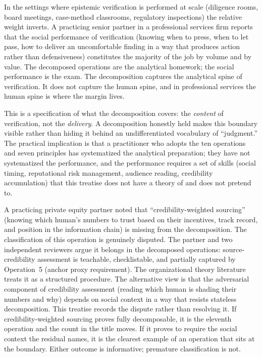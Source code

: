 \documentclass[11pt]{article}
\begin{document}
In the settings where epistemic verification is performed at scale (diligence rooms, board meetings, case-method classrooms, regulatory inspections) the relative weight inverts. A practicing senior partner in a professional services firm reports that the social performance of verification (knowing when to press, when to let pass, how to deliver an uncomfortable finding in a way that produces action rather than defensiveness) constitutes the majority of the job by volume and by value. The decomposed operations are the analytical homework; the social performance is the exam. The decomposition captures the analytical spine of verification. It does not capture the human spine, and in professional services the human spine is where the margin lives.

This is a specification of what the decomposition covers: the \emph{content} of verification, not the \emph{delivery}. A decomposition honestly held makes this boundary visible rather than hiding it behind an undifferentiated vocabulary of ``judgment.'' The practical implication is that a practitioner who adopts the ten operations and seven principles has systematized the analytical preparation; they have not systematized the performance, and the performance requires a set of skills (social timing, reputational risk management, audience reading, credibility accumulation) that this treatise does not have a theory of and does not pretend to.

A practicing private equity partner noted that ``credibility-weighted sourcing'' (knowing which human's numbers to trust based on their incentives, track record, and position in the information chain) is missing from the decomposition. The classification of this operation is genuinely disputed. The partner and two independent reviewers argue it belongs in the decomposed operations: source-credibility assessment is teachable, checklistable, and partially captured by Operation~5 (anchor proxy requirement). The organizational theory literature treats it as a structured procedure. The alternative view is that the adversarial component of credibility assessment (reading which human is shading their numbers and why) depends on social context in a way that resists stateless decomposition. This treatise records the dispute rather than resolving it. If credibility-weighted sourcing proves fully decomposable, it is the eleventh operation and the count in the title moves. If it proves to require the social context the residual names, it is the clearest example of an operation that sits at the boundary. Either outcome is informative; premature classification is not.
\end{document}
